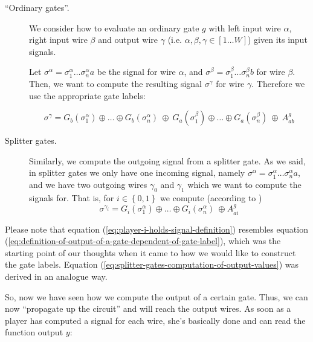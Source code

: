 \begin{description}
\item[``Ordinary gates''.] We consider how to evaluate an ordinary gate $g$ with left input wire $\alpha$, right input wire $\beta$ and output wire $\gamma$ (i.e. $\alpha,\beta,\gamma\in[1\dots W]$) given its input signals.

Let $\sigma^\alpha=\sigma_1^\alpha\dots\sigma_n^\alpha a$ be the signal for wire $\alpha$, and $\sigma^\beta=\sigma_1^\beta\dots\sigma_n^\beta b$ for wire $\beta$. Then, we want to compute the resulting signal $\sigma^\gamma$ for wire $\gamma$. Therefore we use the appropriate gate labels:

\begin{equation}
  \label{eq:player-i-holds-signal-definition}
  \sigma^\gamma=G_b(\sigma_1^{\alpha})\oplus\dots\oplus G_b(\sigma_n^{\alpha})
               \ \oplus \
               G_a(\sigma_1^{\beta})\oplus\dots\oplus G_a(\sigma_n^{\beta})
               \ \oplus\ 
               A_{ab}^g
\end{equation}

\item[Splitter gates.] Similarly, we compute the outgoing signal from a splitter gate. As we said, in splitter gates we only have one incoming signal, namely $\sigma^\alpha=\sigma_1^\alpha\dots\sigma_n^\alpha a$, and we have two outgoing wires $\gamma_0$ and $\gamma_1$ which we want to compute the signals for. That is, for $i\in\left\{ 0,1 \right\}$ we compute (according to \cite{Xu:2004:MAS:1023552})
  \begin{equation}
    \label{eq:splitter-gates-computation-of-output-values}
    \sigma^{\gamma_i}=G_i(\sigma_1^\alpha)\oplus\dots\oplus G_i(\sigma_n^\alpha) \ \oplus A_{ai}^g
  \end{equation}
\end{description}

Please note that equation (\ref{eq:player-i-holds-signal-definition}) resembles equation (\ref{eq:definition-of-output-of-a-gate-dependent-of-gate-label}), which was the starting point of our thoughts when it came to how we would like to construct the gate labels. Equation (\ref{eq:splitter-gates-computation-of-output-values}) was derived in an analogue way.

So, now we have seen how we compute the output of a certain gate. Thus, we can now ``propagate up the circuit'' and will reach the output wires. As soon as a player has computed a signal for each wire, she's basically done and can read the function output $y$:


